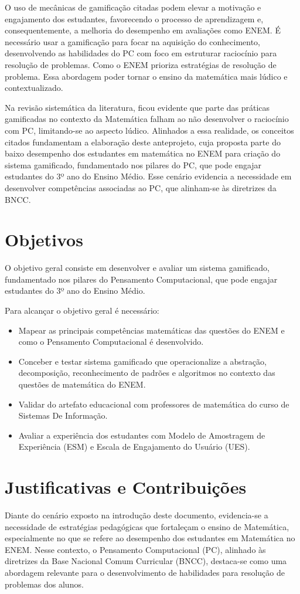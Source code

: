 \documentclass{abnt}
\begin{document}
O uso de mecânicas de gamificação citadas podem elevar a motivação e engajamento
dos estudantes, favorecendo o processo de aprendizagem e, consequentemente, a
melhoria do desempenho em avaliações como ENEM. É necessário usar a gamificação
para focar na aquisição do conhecimento, desenvolvendo as habilidades do PC com
foco em estruturar raciocínio para resolução de problemas. Como o ENEM prioriza
estratégias de resolução de problema. Essa abordagem poder tornar o ensino da
matemática mais lúdico e contextualizado.

Na revisão sistemática da literatura, ficou evidente que parte das práticas
gamificadas no contexto da Matemática falham ao não desenvolver o raciocínio com
PC, limitando-se ao aspecto lúdico. Alinhados a essa realidade, os conceitos
citados fundamentam a elaboração deste anteprojeto, cuja proposta parte do baixo
desempenho dos estudantes em matemática no ENEM para criação do sistema
gamificado, fundamentado nos pilares do PC, que pode engajar estudantes do 3º
ano do Ensino Médio. Esse cenário evidencia a necessidade em desenvolver
competências associadas ao PC, que alinham-se às diretrizes da BNCC.

\chapter{Objetivos}
O objetivo geral consiste em desenvolver e avaliar um sistema gamificado,
fundamentado nos pilares do Pensamento Computacional, que pode engajar
estudantes do 3º ano do Ensino Médio.

Para alcançar o objetivo geral é necessário:  
\begin{itemize}
    \item Mapear as principais competências matemáticas das questões do ENEM e
    como o Pensamento Computacional é desenvolvido.
    \item Conceber e testar sistema gamificado que operacionalize a abstração,
    decomposição, reconhecimento de padrões e algoritmos no contexto das
    questões de matemática do ENEM.
    \item Validar do artefato educacional com professores de matemática do curso
    de Sistemas De Informação.
    \item Avaliar a experiência dos estudantes com Modelo de Amostragem de
    Experiência (ESM) e Escala de Engajamento do Usuário (UES).
\end{itemize}

\chapter{Justificativas e Contribuições}
Diante do cenário exposto na introdução deste documento, evidencia-se a
necessidade de estratégias pedagógicas que fortaleçam o ensino de Matemática,
especialmente no que se refere ao desempenho dos estudantes em Matemática no
ENEM. Nesse contexto, o Pensamento Computacional (PC), alinhado às diretrizes da
Base Nacional Comum Curricular (BNCC), destaca-se como uma abordagem relevante
para o desenvolvimento de habilidades para resolução de problemas dos alunos.
\end{document}
